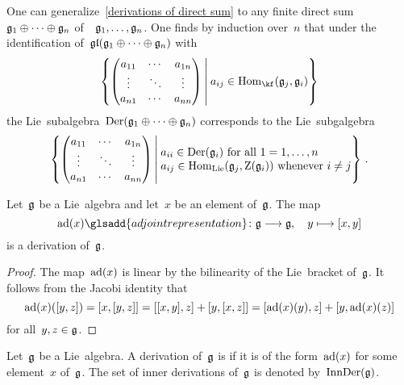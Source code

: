 \begin{remark}
  One can generalize~\cref{derivations of direct sum} to any finite direct sum~$\mathfrak{g}_1 \oplus \dotsb \oplus \mathfrak{g}_n$ of~\liealgebras{$\kf$}~$\mathfrak{g}_1, \dotsc, \mathfrak{g}_n$.
  One finds by induction over~$n$ that under the identification of~$\mathfrak{gl}( \mathfrak{g}_1 \oplus \dotsb \oplus \mathfrak{g}_n )$ with
  \[
    \left\{
      \begin{pmatrix}
        a_{11}  & \cdots  & a_{1n}  \\
        \vdots  & \ddots  & \vdots  \\
        a_{n1}  & \cdots  & a_{nn}
      \end{pmatrix}
    \suchthat*
      a_{ij} \in \Hom_{\kf}( \glie_j, \glie_i )
    \right\}
  \]
  the Lie~subalgebra~$\operatorname{Der}(\mathfrak{g}_1 \oplus \dotsb \oplus \mathfrak{g}_n)$ corresponds to the Lie~subgalgebra
  \[
    \left\{
      \begin{pmatrix}
        a_{11}  & \cdots  & a_{1n}  \\
        \vdots  & \ddots  & \vdots  \\
        a_{n1}  & \cdots  & a_{nn}
      \end{pmatrix}
    \suchthat*
      \begin{tabular}{@{}l@{}}
        $a_{ii} \in \Der(\glie_i)$ for all~$1 = 1, \dotsc, n$ \\
        $a_{ij} \in \Hom_{\Lie}(\glie_j, \centerlie(\glie_i))$ whenever~$i \neq j$
      \end{tabular}
    \right\} \,.
  \]
\end{remark}


\begin{proposition}
  \label{lie algebras act adjoint by derivations}
  Let~$\mathfrak{g}$ be a Lie~algebra and let~$x$ be an element of~$\mathfrak{g}$.
  The map
  \[
    \ad(x)\glsadd{adjoint representation}
    \colon
    \glie
    \to
    \glie,
    \quad
    y
    \mapsto
    [x,y]
  \]
  is a derivation of~$\mathfrak{g}$.
\end{proposition}


\begin{proof}
  The map~$\operatorname{ad}(x)$ is linear by the bilinearity of the Lie~bracket of~$\mathfrak{g}$.
  It follows from the Jacobi identity that
  \[
    \operatorname{ad}(x)([y,z])
    =
    [x,[y,z]]
    =
    [[x,y],z] + [y,[x,z]] \\
    =
    [\operatorname{ad}(x)(y), z] + [y, \operatorname{ad}(x)(z)]
  \]
  for all~$y,z \in \mathfrak{g}$.
\end{proof}


\begin{definition}
  \label{definition of inner derivations}
 Let~$\mathfrak{g}$ be a Lie~algebra.
 A derivation of~$\mathfrak{g}$ is  if it is of the form~$\operatorname{ad}(x)$ for some element~$x$ of~$\mathfrak{g}$.
 The set of inner derivations of~$\mathfrak{g}$ is denoted by~$\operatorname{InnDer}(\mathfrak{g})$.
\end{definition}


